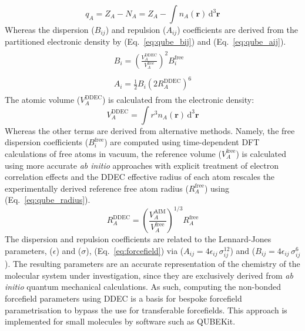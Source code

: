 %
\begin{equation} \label{eq:ddec_charge}
    q_A = Z_A - N_A = Z_A - \int n_A(\mathbf{r}) \, \mathrm{d}^3 \mathbf{r}
\end{equation}
%
Whereas the dispersion ($B_{ij}$) and repulsion ($A_{ij}$) coefficients are derived from the partitioned electronic density by (Eq.~\ref{eq:qube_bij}) and (Eq.~\ref{eq:qube_aij}).\cite{horton2019qubekit}
\vspace{-2mm}
\begin{subequations} 
\begin{align}
\begin{split}\label{eq:qube_bij}
B_{i}=\left(\frac{V_{A}^{\mathrm{DDEC}}}{V_{A}^{\mathrm{free}}}\right)^{2} B_{i}^{\mathrm{free}}
\end{split}\\
\begin{split}\label{eq:qube_aij}
A_{i}=\frac{1}{2} B_{i}\left(2 R_{A}^{\mathrm{DDEC}}\right)^{6}
\end{split}
\end{align}
\end{subequations}
%
The atomic volume ($V_{A}^{\mathrm{DDEC}}$) is calculated from the electronic density:
%
\begin{equation} \label{eq:qube_volume}
V_{A}^{\mathrm{DDEC}}=\int r^{3} n_{A}(\mathbf{r}) \, \mathrm{d}^{3} \mathbf{r}
\end{equation}
%
Whereas the other terms are derived from alternative methods. Namely, the free dispersion coefficients ($B_{i}^{\mathrm{free}}$) are computed using time-dependent DFT calculations of free atoms in vacuum,\cite{chu2004linear} the reference volume ($V_{A}^{\mathrm{free}}$) is calculated using more accurate \textit{ab initio} approaches with explicit treatment of electron correlation effects and the DDEC effective radius of each atom rescales the experimentally derived reference free atom radius ($R_{A}^{\mathrm{free}}$) using (Eq.~\ref{eq:qube_radius}).\cite{horton2019qubekit} 
%
\begin{equation} \label{eq:qube_radius}
R_{A}^{\mathrm{DDEC}}=\left(\frac{V_{A}^{\mathrm{AIM}}}{V_{A}^{\mathrm{free}}}\right)^{1 / 3} R_{A}^{\mathrm{free}}
\end{equation}
%
The dispersion and repulsion coefficients are related to the Lennard-Jones parameters, ($\epsilon$) and ($\sigma$), (Eq.~\ref{eq:forcefield}) via ($A_{ij} = 4 \epsilon_{ij}\,\sigma_{ij}^{12}$) and ($B_{ij} = 4 \epsilon_{ij}\,\sigma_{ij}^{6}$). The resulting parameters are an accurate representation of the chemistry of the molecular system under investigation, since they are exclusively derived from \textit{ab initio} quantum mechanical calculations. As such, computing the non-bonded forcefield parameters using DDEC is a basis for bespoke forcefield parametrisation to bypass the use for transferable forcefields. This approach is implemented for small molecules by software such as QUBEKit.\cite{horton2019qubekit} 

